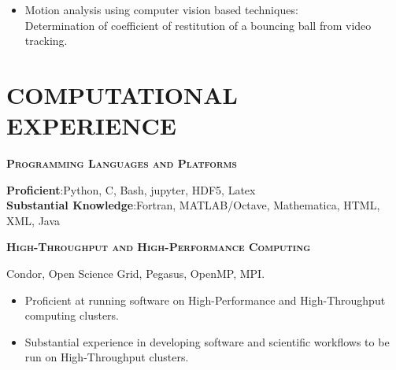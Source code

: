 {
  {\begin{itemize}
    \renewcommand{\labelitemi}{~}
    \item Motion analysis using computer vision based techniques: \\ Determination of coefficient of restitution of a bouncing ball from video tracking.
  \end{itemize}
  }
}
\vspace{2mm}

\section{COMPUTATIONAL EXPERIENCE}
\textsc{\textbf{Programming Languages and Platforms}}
\begin{addmargin}[2em]{2em}
{\textbf{Proficient}:\hspace{2ex}}{Python, C, Bash, jupyter, HDF5, Latex} \\
{\textbf{Substantial Knowledge}:\hspace{2ex}}{Fortran, MATLAB/Octave, Mathematica, HTML, XML, Java}  \\
\end{addmargin}
\textsc{\textbf{High-Throughput and High-Performance Computing}}
\begin{addmargin}[2em]{2em}
{Condor, Open Science Grid, Pegasus, OpenMP, MPI.
\begin{itemize}
\renewcommand{\labelitemi}{-}
\vspace{-2mm}
\item Proficient at running software on High-Performance and High-Throughput computing clusters.
\vspace{-3mm}
\item Substantial experience in developing software and scientific workflows to be run on High-Throughput clusters.
\end{itemize}
}
\end{addmargin}

